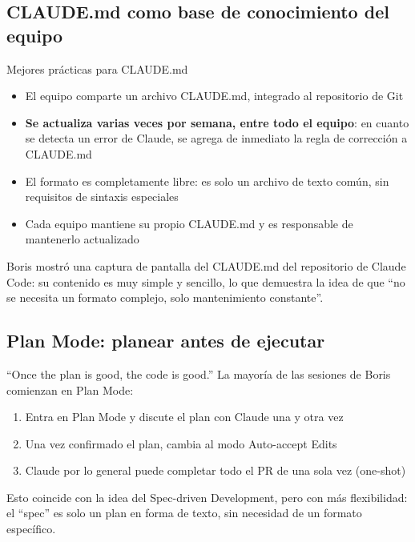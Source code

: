 \subsection{CLAUDE.md como base de conocimiento del equipo}

\begin{importantbox}{Mejores prácticas para CLAUDE.md}
\begin{itemize}
    \item El equipo comparte un archivo CLAUDE.md, integrado al repositorio de Git
    \item \textbf{Se actualiza varias veces por semana, entre todo el equipo}: en cuanto se detecta un error de Claude, se agrega de inmediato la regla de corrección a CLAUDE.md
    \item El formato es completamente libre: es solo un archivo de texto común, sin requisitos de sintaxis especiales
    \item Cada equipo mantiene su propio CLAUDE.md y es responsable de mantenerlo actualizado
\end{itemize}
\end{importantbox}

Boris mostró una captura de pantalla del CLAUDE.md del repositorio de Claude Code: su contenido es muy simple y sencillo, lo que demuestra la idea de que ``no se necesita un formato complejo, solo mantenimiento constante''.

\subsection{Plan Mode: planear antes de ejecutar}

\begin{importantbox}{``Once the plan is good, the code is good.''}
La mayoría de las sesiones de Boris comienzan en Plan Mode:
\begin{enumerate}
    \item Entra en Plan Mode y discute el plan con Claude una y otra vez
    \item Una vez confirmado el plan, cambia al modo Auto-accept Edits
    \item Claude por lo general puede completar todo el PR de una sola vez (one-shot)
\end{enumerate}
Esto coincide con la idea del Spec-driven Development, pero con más flexibilidad: el ``spec'' es solo un plan en forma de texto, sin necesidad de un formato específico.
\end{importantbox}

